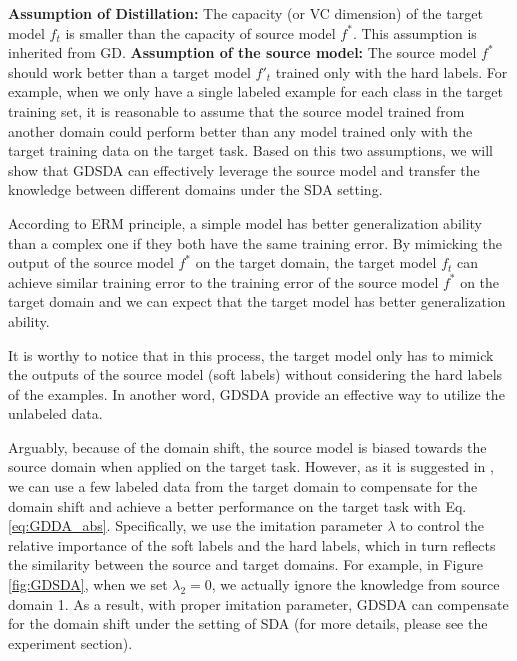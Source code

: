 \textbf{Assumption of Distillation:} The capacity (or VC dimension) of the target model $f_t$ is smaller than the capacity of source model $f^*$. This assumption is inherited from GD.
\textbf{Assumption of the source model:} The source model $f^*$ should work better than a target model $f'_t$ trained only with the hard labels. For example, when we only have a single labeled example for each class in the target training set, it is reasonable to assume that the source model trained from another domain could perform better than any model trained only with the target training data on the target task. Based on this two assumptions, we will show that GDSDA can effectively leverage the source model and transfer the knowledge between different domains under the SDA setting.

According to ERM principle\cite{vapnik1999overview}, a simple model has better generalization ability than a complex one if they both have the same training error.
By mimicking the output of the source model $f^*$ on the target domain, the target model $f_t$ can achieve similar training error to the training error of the source model $f^*$ on the target domain and we can expect that the target model has better generalization ability.

It is worthy to notice that in this process, the target model only has to mimick the outputs of the source model (soft labels) without considering the hard labels of the examples. In another word, GDSDA provide an effective way to utilize the unlabeled data.

Arguably, because of the domain shift, the source model is biased towards the source domain when applied on the target task. However, as it is suggested in \cite{hinton2015distilling}, we can use a few labeled data from the target domain to compensate for the domain shift and achieve a better performance on the target task with Eq. \eqref{eq:GDDA_abs}. Specifically, we use the imitation parameter $\lambda$ to control the relative importance of the soft labels and the hard labels, which in turn reflects the similarity between the source and target domains. 
For example, in Figure \ref{fig:GDSDA}, when we set $\lambda_2=0$, we actually ignore the knowledge from source domain 1.
As a result, with proper imitation parameter, GDSDA can compensate for the domain shift under the setting of SDA (for more details, please see the experiment section).

